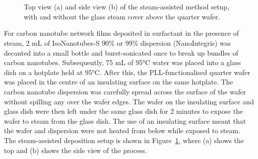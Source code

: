 \documentclass[
  a4paper,
]{scrbook}
\begin{document}
\begin{figure}
\begin{minipage}[t]{0.03\linewidth}
{{}

}

\end{minipage}%
%
\begin{minipage}[t]{0.01\linewidth}

{\centering 

~

}

\end{minipage}%
%
\begin{minipage}[t]{0.45\linewidth}

{\centering 


}

\end{minipage}%
%
\begin{minipage}[t]{0.01\linewidth}

{\centering 

~

}

\end{minipage}%

\caption{\label{fig-steaming-method}Top view (a) and side view (b) of
the steam-assisted method setup, with and without the glass steam cover
above the quarter wafer.}

\end{figure}

For carbon nanotube network films deposited in surfactant in the
presence of steam, 2 mL of IsoNanotubes-S 90\% or 99\% dispersion
(NanoIntegris) was decanted into a small bottle and burst-sonicated once
to break up bundles of carbon nanotubes. Subsequently, 75 mL of 95°C
water was placed into a glass dish on a hotplate held at 95°C. After
this, the PLL-functionalised quarter wafer was placed in the centre of
an insulating surface on the same hotplate. The carbon nanotube
dispersion was carefully spread across the surface of the wafer without
spilling any over the wafer edges. The wafer on the insulating surface
and glass dish were then left under the same glass dish for 2 minutes to
expose the wafer to steam from the glass dish. The use of an insulating
surface meant that the wafer and dispersion were not heated from below
while exposed to steam. The steam-assisted deposition setup is shown in
Figure~\ref{fig-steaming-method}, where (a) shows the top and (b) shows
the side view of the process.
\end{document}
